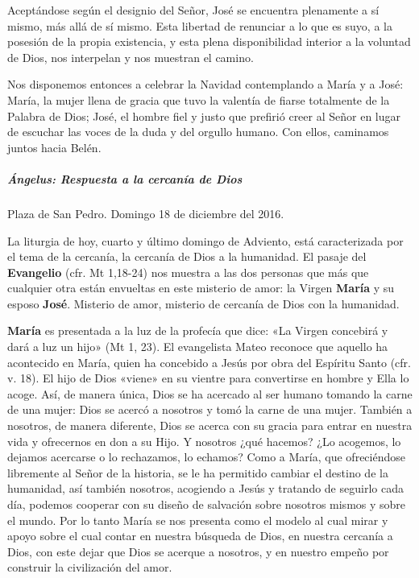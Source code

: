 \documentclass[]{article}
\let\oldsubparagraph\subparagraph
\renewcommand{\subparagraph}[1]{\oldsubparagraph{#1}\mbox{}}
\begin{document}
Aceptándose según el designio del Señor, José se encuentra plenamente a
sí mismo, más allá de sí mismo. Esta libertad de renunciar a lo que es
suyo, a la posesión de la propia existencia, y esta plena disponibilidad
interior a la voluntad de Dios, nos interpelan y nos muestran el camino.

Nos disponemos entonces a celebrar la Navidad contemplando a María y a
José: María, la mujer llena de gracia que tuvo la valentía de fiarse
totalmente de la Palabra de Dios; José, el hombre fiel y justo que
prefirió creer al Señor en lugar de escuchar las voces de la duda y del
orgullo humano. Con ellos, caminamos juntos hacia
Belén.\protect\hypertarget{_Toc448662765}{}{}

\subparagraph{Ángelus: Respuesta a la cercanía de
Dios}\label{uxe1ngelus-respuesta-a-la-cercanuxeda-de-dios}

Plaza de San Pedro. Domingo 18 de diciembre del 2016.

La liturgia de hoy, cuarto y último domingo de Adviento, está
caracterizada por el tema de la cercanía, la cercanía de Dios a la
humanidad. El pasaje del \textbf{Evangelio} (cfr. Mt 1,18-24) nos
muestra a las dos personas que más que cualquier otra están envueltas en
este misterio de amor: la Virgen \textbf{María} y su esposo
\textbf{José}. Misterio de amor, misterio de cercanía de Dios con la
humanidad.

\textbf{María} es presentada a la luz de la profecía que dice: «La
Virgen concebirá y dará a luz un hijo» (Mt 1, 23). El evangelista Mateo
reconoce que aquello ha acontecido en María, quien ha concebido a Jesús
por obra del Espíritu Santo (cfr. v. 18). El hijo de Dios «viene» en su
vientre para convertirse en hombre y Ella lo acoge. Así, de manera
única, Dios se ha acercado al ser humano tomando la carne de una mujer:
Dios se acercó a nosotros y tomó la carne de una mujer. También a
nosotros, de manera diferente, Dios se acerca con su gracia para entrar
en nuestra vida y ofrecernos en don a su Hijo. Y nosotros ¿qué hacemos?
¿Lo acogemos, lo dejamos acercarse o lo rechazamos, lo echamos? Como a
María, que ofreciéndose libremente al Señor de la historia, se le ha
permitido cambiar el destino de la humanidad, así también nosotros,
acogiendo a Jesús y tratando de seguirlo cada día, podemos cooperar con
su diseño de salvación sobre nosotros mismos y sobre el mundo. Por lo
tanto María se nos presenta como el modelo al cual mirar y apoyo sobre
el cual contar en nuestra búsqueda de Dios, en nuestra cercanía a Dios,
con este dejar que Dios se acerque a nosotros, y en nuestro empeño por
construir la civilización del amor.
\end{document}
